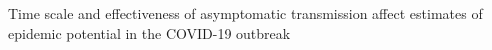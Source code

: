 
Time scale and effectiveness of asymptomatic transmission affect estimates of epidemic potential in the COVID-19 outbreak
